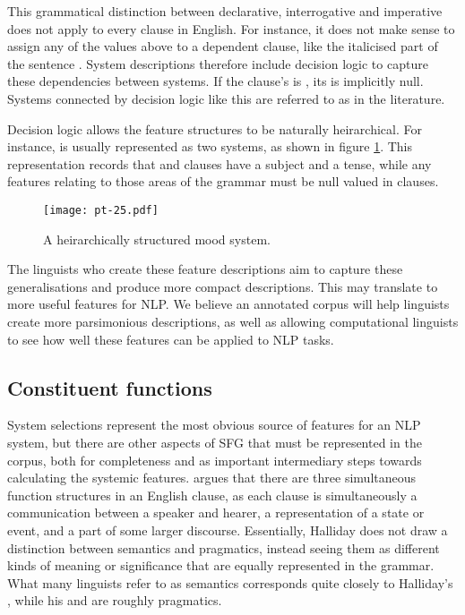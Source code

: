 \documentclass[11pt]{article}
\begin{document}
This grammatical distinction between declarative, interrogative and imperative does not apply to every clause in English. For instance, it does not make sense to assign any of the values above to a dependent clause, like the italicised part of the sentence . System descriptions therefore include decision logic to capture these dependencies between systems. If the clause's  is , its  is implicitly null. Systems connected by decision logic like this are referred to as  in the literature.



Decision logic allows the feature structures to be naturally heirarchical. For instance,  is usually represented as two systems, as shown in figure \ref{mood-tiered}. This representation records that  and  clauses have a subject and a tense, while any features relating to those areas of the grammar must be null valued in  clauses.

\begin{figure}[h!]
  \centering
  \texttt{[image: pt-25.pdf]}
  \caption{A heirarchically structured mood system.}\label{mood-tiered}
\end{figure}

The linguists who create these feature descriptions aim to capture these generalisations and produce more compact descriptions. This may translate to more useful features for NLP. We believe an annotated corpus will help linguists create more parsimonious descriptions, as well as allowing computational linguists to see how well these features can be applied to NLP tasks.


\subsection{Constituent functions}

System selections represent the most obvious source of features for an NLP system, but there are other aspects of SFG that must be represented in the corpus, both for completeness and as important intermediary steps towards calculating the systemic features. \citet{halliday_options} argues that there are three simultaneous function structures in an English clause, as each clause is simultaneously a communication between a speaker and hearer, a representation of a state or event, and a part of some larger discourse. Essentially, Halliday does not draw a distinction between semantics and pragmatics, instead seeing them as different kinds of meaning or significance that are equally represented in the grammar. What many linguists refer to as semantics corresponds quite closely to Halliday's , while his  and  are roughly pragmatics.
\end{document}
